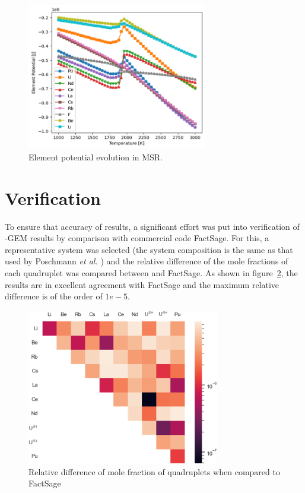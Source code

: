 \begin{figure}
         \centering
         \includegraphics[width=0.7\textwidth]{figures/chapter-7/ep_msr.png}
         \caption{Element potential evolution in MSR.}
         \label{fig:res_epmsr}
 \end{figure}
 
\section{Verification}
To ensure that accuracy of results, a significant effort was put into verification of {\YJ}-GEM results by comparison with commercial code FactSage. For this, a representative system was selected (the system composition is the same as that used by Poschmann \textit{et al.} \cite{POSCHMANN2021102341}) and the relative difference of the mole fractions of each quadruplet was compared between {\YJ} and FactSage. As shown in figure~\ref{fig:verif}, the results are in excellent agreement with FactSage and the maximum relative difference is of the order of $1e-5$.
 \begin{figure}[h!]
        \centering
        \includegraphics[width=0.75\textwidth]{figures/chapter-7/verif.png}
        \caption{Relative difference of mole fraction of quadruplets when compared to FactSage}
        \label{fig:verif}
    \end{figure}